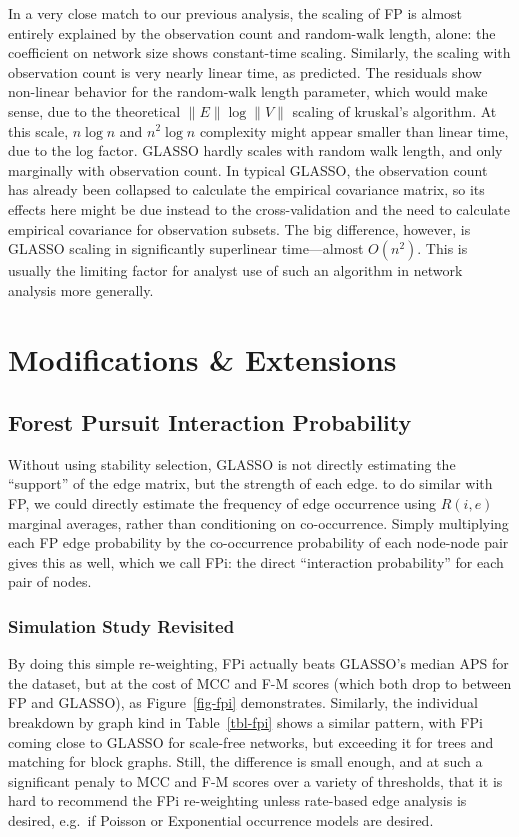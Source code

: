 \documentclass[%
	12pt,
		oneside,
		letterpaper
]{book}
\begin{document}
In a very close match to our previous analysis, the scaling of FP is
almost entirely explained by the observation count and random-walk
length, alone: the coefficient on network size shows constant-time
scaling. Similarly, the scaling with observation count is very nearly
linear time, as predicted. The residuals show non-linear behavior for
the random-walk length parameter, which would make sense, due to the
theoretical \(\|E\|\log\|V\|\) scaling of kruskal's algorithm. At this
scale, \(n\log n\) and \(n^2\log n\) complexity might appear smaller
than linear time, due to the log factor. GLASSO hardly scales with
random walk length, and only marginally with observation count. In
typical GLASSO, the observation count has already been collapsed to
calculate the empirical covariance matrix, so its effects here might be
due instead to the cross-validation and the need to calculate empirical
covariance for observation subsets. The big difference, however, is
GLASSO scaling in significantly superlinear time---almost \(O(n^2)\).
This is usually the limiting factor for analyst use of such an algorithm
in network analysis more generally.

\chapter{Modifications \& Extensions}\label{modifications-extensions}

\section{Forest Pursuit Interaction Probability}\label{sec-fpi}

Without using stability
selection\autocite{StabilitySelection_Meinshausen2010}, GLASSO is not
directly estimating the ``support'' of the edge matrix, but the strength
of each edge. to do similar with FP, we could directly estimate the
frequency of edge occurrence using \(R(i,e)\) marginal averages, rather
than conditioning on co-occurrence. Simply multiplying each FP edge
probability by the co-occurrence probability of each node-node pair
gives this as well, which we call FPi: the direct ``interaction
probability'' for each pair of nodes.

\subsection{Simulation Study
Revisited}\label{simulation-study-revisited}

By doing this simple re-weighting, FPi actually beats GLASSO's median
APS for the dataset, but at the cost of MCC and F-M scores (which both
drop to between FP and GLASSO), as Figure~\ref{fig-fpi} demonstrates.
Similarly, the individual breakdown by graph kind in Table~\ref{tbl-fpi}
shows a similar pattern, with FPi coming close to GLASSO for scale-free
networks, but exceeding it for trees and matching for block graphs.
Still, the difference is small enough, and at such a significant penaly
to MCC and F-M scores over a variety of thresholds, that it is hard to
recommend the FPi re-weighting unless rate-based edge analysis is
desired, e.g.~if Poisson or Exponential occurrence models are desired.
\end{document}
